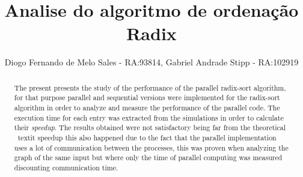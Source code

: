 \documentclass[journal]{IEEEtran}
\begin{document}
%
\title{Analise do algoritmo de ordenação Radix}
%
%
%

\author{Diogo Fernando de Melo Sales - RA:93814,
        Gabriel Andrade Stipp - RA:102919
}

% 











\maketitle


\begin{abstract}
The present presents the study of the performance of the parallel radix-sort algorithm, for that purpose parallel and sequential versions were implemented for the radix-sort algorithm in order to analyze and measure the performance of the parallel code. The execution time for each entry was extracted from the simulations in order to calculate their \textit{speedup}. The results obtained were not satisfactory being far from the theoretical \ textit {speedup} this also happened due to the fact that the parallel implementation uses a lot of communication between the processes, this was proven when analyzing the graph of the same input but where only the time of parallel computing was measured discounting communication time.
\end{abstract}
\end{document}
